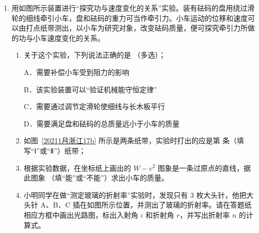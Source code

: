 \documentclass[\gkver]{gaokaozhenti}
\begin{document}
\begin{enumerate}
{figs/16b.png}

{电动势的最大值为 $U_{m}$}
{流过电阻的电荷 $\frac{2BL^{2}}{R}$}
{电阻产生的焦耳热 $\frac{\pi U_{m}BL^{2}}{R}$}


\item
用如图所示装置进行“探究功与速度变化的关系”实验。装有砝码的盘用绕过滑轮的细线牵引小车，盘和砝码的重力可当作牵引力。小车运动的位移和速度可以由打点纸带测出，以小车为研究对象，改变砝码质量，便可探究牵引力所做的功与小车速度变化的关系。


\begin{enumerate}
	\item
	关于这个实验，下列说法正确的是 （多选）；

	A．需要补偿小车受到阻力的影响

	B．该实验装置可以“验证机械能守恒定律”

	C．需要通过调节定滑轮使细线与长木板平行

	D．需要满足盘和砝码的总质量远小于小车的质量
	\item
	如图~\ref{20211月浙江17b} 所示是两条纸带，实验时打出的应是第  条（填写“Ⅰ”或“Ⅱ”）纸带；

	\item
	根据实验数据，在坐标纸上画出的 $W-v^{2}$ 图象是一条过原点的直线，据此图象 （填“能”或“不能”）求出小车的质量。
	\item
	小明同学在做“测定玻璃的折射率”实验时，发现只有 3 枚大头针，他把大头针 A、B、C 插在如图所示位置，并测出了玻璃的折射率。请在答题纸相应方框中画出光路图，标出入射角 $i$ 和折射角 $r$，并写出折射率 $n$ 的计算式。


\end{enumerate}
\end{enumerate}
\end{document}
